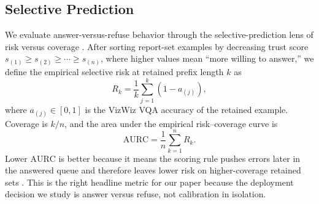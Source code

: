 \documentclass{ieeeaccess}
\newcommand{\aurc}{\mathrm{AURC}}
\begin{document}
\subsection{Selective Prediction}
We evaluate answer-versus-refuse behavior through the selective-prediction lens of risk versus coverage \cite{elyaniv2010foundations,geifman2017selective,geifman2019selectivenet}. After sorting report-set examples by decreasing trust score $s_{(1)} \geq s_{(2)} \geq \cdots \geq s_{(n)}$, where higher values mean ``more willing to answer,'' we define the empirical selective risk at retained prefix length $k$ as
\begin{equation}
R_k = \frac{1}{k}\sum_{j=1}^{k} \left(1-a_{(j)}\right),
\end{equation}
where $a_{(j)} \in [0,1]$ is the VizWiz VQA accuracy of the retained example. Coverage is $k/n$, and the area under the empirical risk--coverage curve is
\begin{equation}
\aurc = \frac{1}{n}\sum_{k=1}^{n} R_k.
\end{equation}
Lower $\aurc$ is better because it means the scoring rule pushes errors later in the answered queue and therefore leaves lower risk on higher-coverage retained sets \cite{whitehead2022reliable,dancette2023improving,eisenschlos2024selectively,khan2024consistency,srinivasan2024selective}. This is the right headline metric for our paper because the deployment decision we study is answer versus refuse, not calibration in isolation.
\end{document}
